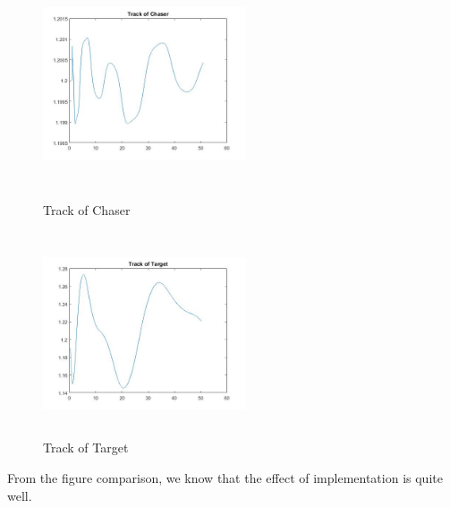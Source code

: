 \begin{figure}[htbp]
\centering
\begin{minipage}[t]{0.48\textwidth}
\centering
\includegraphics[width=6cm,height=6cm]{fig/simulation/ThrustStable/TrackofChaser.jpg}
\caption{Track of Chaser}
\end{minipage}
\begin{minipage}[t]{0.48\textwidth}
\centering
\includegraphics[width=6cm,height=6cm]{fig/simulation/ThrustStable/Trackoftarget.jpg}
\caption{Track of Target}
\end{minipage}
\end{figure}
From the figure comparison, we know that the effect of implementation is quite well.
\newpage
